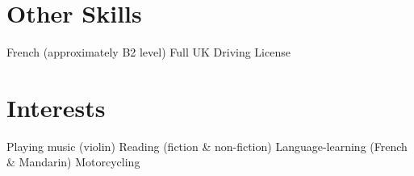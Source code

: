 \documentclass[letterpaper]{deedy-resume-openfont} %
\begin{document}
\begin{minipage}[t]{0.33\textwidth}
\sectionspace %

\section{Other Skills}

French (approximately B2 level) \textbullet{} Full UK Driving License

\sectionspace %

\section{Interests}

Playing music (violin) \textbullet{} Reading (fiction \& non-fiction) \textbullet{} Language-learning (French \& Mandarin) \textbullet{} Motorcycling \\


\end{minipage} %
\hfill
%
%
\end{document}
